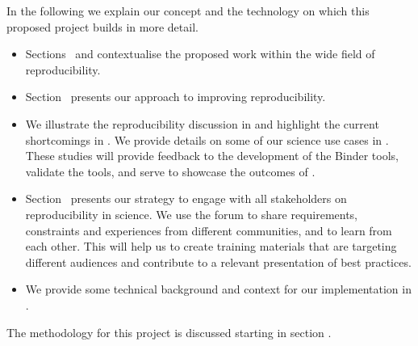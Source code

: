 In the following we explain our concept and the technology on which this
proposed project builds in more detail.
\begin{itemize}
\item Sections~ and
   contextualise the proposed work
  within the wide field of reproducibility.
\item Section~ presents our approach to improving reproducibility.
\item We illustrate the reproducibility discussion in 
   and highlight the current shortcomings
  in .
    We provide details on some of our science use cases in 
  . These studies will provide feedback to the development of the 
  Binder tools, validate the tools, and serve to showcase the outcomes of \TheProject.  
\item Section~ presents our strategy to
  engage with all stakeholders on reproducibility in science. We use the forum to  
  share requirements, constraints and experiences from different communities,
  and to learn from each other. This will help us to
  create training materials that are targeting different audiences and 
  contribute to a relevant presentation of best practices.   
\item We provide some technical background and context for our implementation in .
\end{itemize}

\noindent The methodology for this project is discussed starting in section
.



